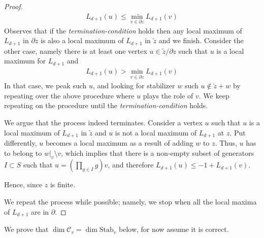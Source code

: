\begin{proof}
  

%





\begin{equation*}
  \begin{split}
    L_{d+1}(u) \le \min_{v \in \partial z} L_{d+1}(v)
  \end{split}
\end{equation*}
Observes that if the \textit{termination-condition} holds then any local maximum of $L_{d+1}$ in $\partial z$ is also a local maximum of $L_{d+1}$ in $\tilde{z}$ and we finish. Consider the other case, namely there is at least one vertex $u \in \tilde{z}/\partial z$ such that $u$ is a local maximum for $L_{d+1}$ and 
\begin{equation*}
  \begin{split}
    L_{d+1}(u) > \min_{v \in \partial z} L_{d+1}(v)
  \end{split}
\end{equation*}
In that case, we peak such $u$, and looking for stabilizer $w$ such $u \notin \tilde{z} + w$ by repeating over the above procedure where $u$ plays the role of $v$. We keep repeating on the procedure until the \textit{termination-condition} holds. 

We argue that the process indeed terminates. Consider a vertex $u$ such that $u$ is a local maximum of $L_{d+1}$ in $\tilde{z}$ and $u$ is not a local maximum of $L_{d+1}$ at $z$. Put differently, $u$ becomes a local maximum as a result of adding $w$ to $z$. Thus, $u$ has to belong to $w|_{v} \setminus v$, which implies that there is a non-empty subset of generators $I \subset S$ such that $u = (\prod_{g \in I} g)v$, and therefore $L_{d+1}(u) \le -1 + L_{d+1}(v)$. 

Hence, since $z$ is finite.  



  
  
We repeat the process while possible; namely, we stop when all the local maxima of $L_{d+1}$ are in $\partial$.
\end{proof}

We prove that $\dim \mathcal{C}_{v} = \dim \text{Stab}_{v}$ below, for now assume it is correct.


